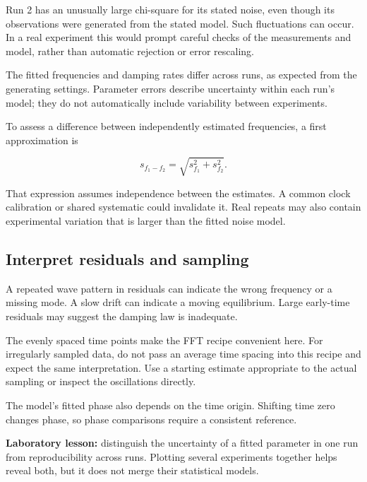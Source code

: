 \documentclass[
  british,
  10pt,
  a4paper,
]{article}
\begin{document}
Run 2 has an unusually large chi-square for its stated noise, even
though its observations were generated from the stated model. Such
fluctuations can occur. In a real experiment this would prompt careful
checks of the measurements and model, rather than automatic rejection or
error rescaling.

The fitted frequencies and damping rates differ across runs, as expected
from the generating settings. Parameter errors describe uncertainty
within each run's model; they do not automatically include variability
between experiments.

To assess a difference between independently estimated frequencies, a
first approximation is

\begin{equation}s_{f_1-f_2}=\sqrt{s_{f_1}^2+s_{f_2}^2}.\end{equation}

That expression assumes independence between the estimates. A common
clock calibration or shared systematic could invalidate it. Real repeats
may also contain experimental variation that is larger than the fitted
noise model.


\subsection{Interpret residuals and
sampling}\label{interpret-residuals-and-sampling}

A repeated wave pattern in residuals can indicate the wrong frequency or
a missing mode. A slow drift can indicate a moving equilibrium. Large
early-time residuals may suggest the damping law is inadequate.

The evenly spaced time points make the FFT recipe convenient here. For
irregularly sampled data, do not pass an average time spacing into this
recipe and expect the same interpretation. Use a starting estimate
appropriate to the actual sampling or inspect the oscillations directly.

The model's fitted phase also depends on the time origin. Shifting time
zero changes phase, so phase comparisons require a consistent reference.

\textbf{Laboratory lesson:} distinguish the uncertainty of a fitted
parameter in one run from reproducibility across runs. Plotting several
experiments together helps reveal both, but it does not merge their
statistical models.

\clearpage
\end{document}
